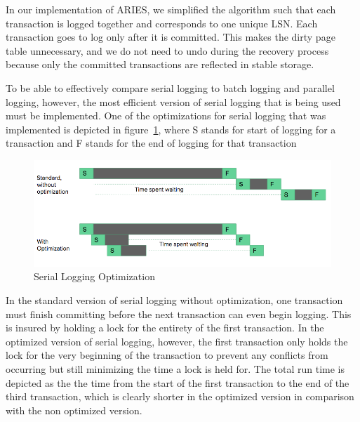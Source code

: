 In our implementation of ARIES, we simplified the algorithm such that each transaction is logged together and corresponds to one unique LSN. Each transaction goes to log only after it is committed. This makes the dirty page table unnecessary, and we do not need to undo during the recovery process because only the committed transactions are reflected in stable storage. \par

To be able to effectively compare serial logging to batch logging and parallel logging, however, the most efficient version of serial logging that is being used must be implemented. One of the optimizations for serial logging that was implemented is depicted in figure~\ref{optimization}, where S stands for start of logging for a transaction and F stands for the end of logging for that transaction\par

\begin{figure}[!h]
  \includegraphics[width=\textwidth]{opt-updated.png}
  \caption{Serial Logging Optimization}
  \label{optimization}
\end{figure}

In the standard version of serial logging without optimization, one transaction must finish committing before the next transaction can even begin logging. This is insured by holding a lock for the entirety of the first transaction. In the optimized version of serial logging, however, the first transaction only holds the lock for the very beginning of the transaction to prevent any conflicts from occurring but still minimizing the time a lock is held for. The total run time is depicted as the the time from the start of the first transaction to the end of the third transaction, which is clearly shorter in the optimized version in comparison with the non optimized version. 